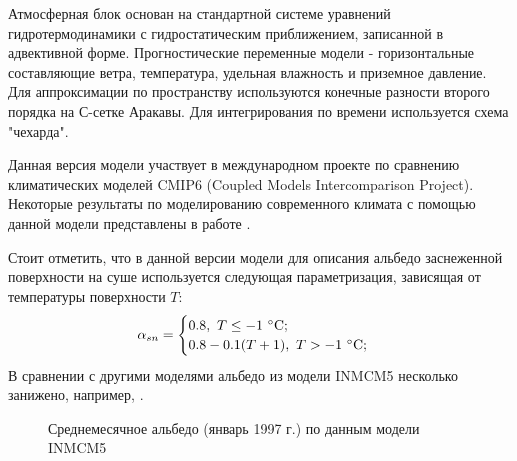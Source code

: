 \documentclass[a4paper, fontsize=14pt]{scrartcl}
\begin{document}
Атмосферная блок основан на стандартной системе уравнений гидротермодинамики с гидростатическим приближением, записанной в адвективной форме. Прогностические переменные модели - горизонтальные составляющие ветра, температура, удельная влажность и приземное давление. Для аппроксимации по пространству используются конечные разности второго порядка на С-сетке Аракавы. Для интегрирования по времени используется схема "чехарда".

Данная версия модели участвует в международном проекте по сравнению климатических моделей CMIP6 (Coupled Models Intercomparison Project). Некоторые результаты по моделированию современного климата с помощью данной модели представлены в работе \cite{Volodin2017}.  \sloppy 

Стоит отметить, что в данной версии модели для описания альбедо заснеженной поверхности на суше используется следующая параметризация, зависящая от температуры поверхности $T$:
\begin{equation}
    \alpha_{sn} = \begin{cases}
                        0.8,~ T \leq -1 ~\degree \mathrm{C}; \\
                        0.8 - 0.1(T + 1), ~T > -1 ~\degree \mathrm{C};
                  \end{cases} \label{sys}
\end{equation}
В сравнении с другими моделями альбедо из модели INMCM5 несколько занижено, например, \cite{Flanner2007, Gueymard2019}.

\newpage
\begin{figure}[h]
    \caption{Среднемесячное альбедо (январь 1997 г.) по данным модели INMCM5}
    \label{fig:image}
\end{figure}
\end{document}
